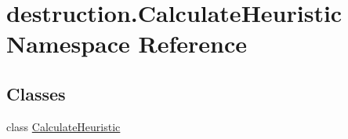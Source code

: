 \hypertarget{namespacedestruction_1_1_calculate_heuristic}{\section{destruction.\-Calculate\-Heuristic Namespace Reference}
\label{namespacedestruction_1_1_calculate_heuristic}
}
\subsection*{Classes}
\begin{DoxyCompactItemize}
\item 
class \hyperlink{classdestruction_1_1_calculate_heuristic_1_1_calculate_heuristic}{Calculate\-Heuristic}
\end{DoxyCompactItemize}
